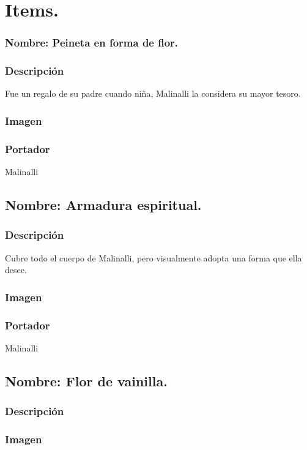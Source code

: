 \chapter{Items.}
	\subsection{Nombre: Peineta en forma de flor.}\label{item:peineta}
	\subsection{Descripción}
	Fue un regalo de su padre cuando niña, Malinalli la considera su mayor tesoro.
	\subsection{Imagen}
	\subsection{Portador}
	Malinalli 

	\section{Nombre: Armadura espiritual.}\label{item:armadura}
	\subsection{Descripción}
	Cubre todo el cuerpo de Malinalli, pero visualmente adopta una forma que ella desee.
	\subsection{Imagen}
	\subsection{Portador}
	Malinalli 
	
	\section{Nombre: Flor de vainilla.}\label{item:vainilla}
	\subsection{Descripción}
	
	\subsection{Imagen}
